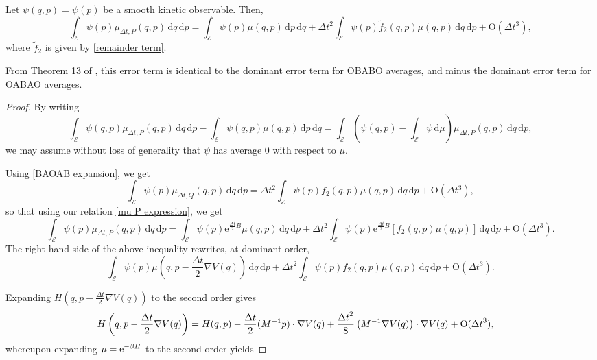 \begin{prop}\label{prop:kappa_p_second_order}
  Let $\psi(q,p)=\psi(p)$ be a smooth kinetic observable. 
   Then,
  \begin{equation}
    \label{prop 2}
    \int_{\mathcal E} \psi(p) \mu_{\Delta t,P}(q,p)\,\mathrm{d}q\, \mathrm{d}p=\int_{\mathcal E}\psi(p)\mu(q,p)\,\mathrm{d}p\, \mathrm{d}q+\Delta t^2\int_{\mathcal E} \psi(p)\tilde f_2(q,p)\mu(q,p)\,\mathrm{d}q\,\mathrm{d}p + \mathrm{O}(\Delta t^3),
  \end{equation}
  where $\tilde f_2$ is given by \eqref{remainder term}.
\end{prop}
From Theorem 13 of \cite{LMS13}, this error term is identical to the dominant error term for OBABO averages, and minus the dominant error term for OABAO averages.
\begin{proof}
  By writing
  $$\int_\mathcal{E}\psi(q,p)\mu_{\Delta t,P}(q,p)\,\mathrm{d} q\,\mathrm{d} p-\int_\mathcal{E}\psi(q,p)\mu(q,p)\,\mathrm{d}p\,\mathrm{d}q=\int_\mathcal{E}\left(\psi(q,p)-\int_{\mathcal E}\psi\,\mathrm{d}\mu\right)\mu_{\Delta t,P}(q,p)\,\mathrm{d} q\,\mathrm{d} p,$$
  we may assume without loss of generality that $\psi$ has average 0 with respect to $\mu$.

  Using \eqref{BAOAB expansion}, we get 
  $$\int_{\mathcal E} \psi(p) \mu_{\Delta t,Q}(q,p)\,\mathrm{d}q\,\mathrm{d}p =\Delta t^2 \int_{\mathcal E}\psi(p)f_2(q,p)\mu(q,p)\,\mathrm{d}q\,\mathrm{d}p + \mathrm{O}(\Delta t^3),$$
  so that using our relation \eqref{mu P expression}, we get
  $$ \int_{\mathcal E} \psi(p) \mu_{\Delta t,P}(q,p)\,\mathrm{d}q\,\mathrm{d}p=\int_{\mathcal E}\psi(p)\mathrm e^{\frac{\Delta t}2B}\mu(q,p)\,\mathrm{d}q\,\mathrm{d}p + \Delta t^2 \int_{\mathcal E}\psi(p)\mathrm e^{\frac{\Delta t}2B}\left [ f_2(q,p)\mu(q,p)\right]\,\mathrm{d}q\,\mathrm{d}p + \mathrm{O}(\Delta t^3).$$
  The right hand side of the above inequality rewrites, at dominant order,
  $$\int_{\mathcal E}\psi(p)\mu\left(q,p-\frac{\Delta t}2\nabla V(q)\right)\,\mathrm{d}q\,\mathrm{d}p + \Delta t^2 \int_{\mathcal E}\psi(p)f_2(q,p)\mu(q,p)\,\mathrm{d}q\,\mathrm{d}p + \mathrm{O}(\Delta t^3).$$

  Expanding $H\left(q,p-\displaystyle{\frac{\Delta t}2}\nabla V(q)\right)$ to the second order gives
  \begin{equation}
    \label{H 2-expansion}
    \begin{aligned}
      H\left(q,p-\frac{\Delta t}2\nabla V(q)\right)&=H(q,p)-\frac{{\Delta t}}2(M^{-1}p)\cdot \nabla V(q)+\frac{{\Delta t}^2}8 \left(M^{-1} \nabla V(q)\right)\cdot \nabla V(q)+\mathrm{O}({\Delta t}^3),
    \end{aligned}
  \end{equation}
  whereupon expanding $\mu=\mathrm{e}^{-\beta H}$ to the second order yields


\end{proof}
